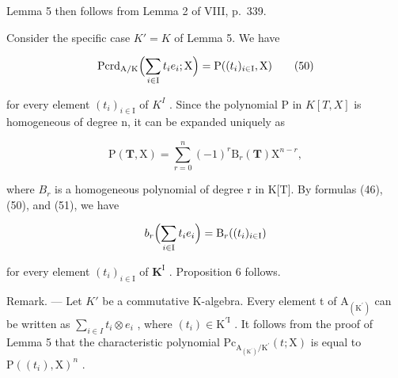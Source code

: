 Lemma 5 then follows from Lemma 2 of VIII, p.~339.

Consider the specific case \(K' = K\) of Lemma 5. We have

\[
\mathrm{Pcrd} _ {\mathrm{A/K}} \Bigl (\sum_ {i \in \mathrm{I}} t _ {i} e _ {i}; \mathrm{X} \Bigr) = \mathrm{P} ((t _ {i}) _ {i \in \mathrm{I}}, \mathrm{X})\tag{50}
\]

for every element \((t_{i})_{i\in\mathrm{I}}\) of \(K^{I}\) . Since the polynomial P in \(K[T,X]\) is homogeneous of degree n, it can be expanded uniquely as

\[
\mathrm{P} (\mathbf {T}, \mathrm{X}) = \sum_ {r = 0} ^ {n} (- 1) ^ {r} \mathrm{B} _ {r} (\mathbf {T}) \mathrm{X} ^ {n - r},\tag{51}
\]

where \(B_{r}\) is a homogeneous polynomial of degree r in K{[}T{]}. By formulas (46), (50), and (51), we have

\[
b _ {r} \Bigl (\sum_ {i \in \mathrm{I}} t _ {i} e _ {i} \Bigr) = \mathrm{B} _ {r} ((t _ {i}) _ {i \in \mathrm{I}})
\]

for every element \((t_i)_{i\in \mathrm{I}}\) of \(\mathbf{K}^{\mathrm{I}}\) . Proposition 6 follows.

Remark. --- Let \(K'\) be a commutative K-algebra. Every element t of \(\mathrm{A}_{(\mathrm{K}^{\prime})}\) can be written as \(\sum_{i\in I}t_{i}\otimes e_{i}\) , where \((t_{i})\in\mathrm{K}^{\prime\mathrm{I}}\) . It follows from the proof of Lemma 5 that the characteristic polynomial \(\mathrm{Pc}_{\mathrm{A}_{(\mathrm{K}^{\prime})}/\mathrm{K}^{\prime}}(t;\mathrm{X})\) is equal to \(\mathrm{P}((t_{i}),\mathrm{X})^{n}\) .
\relax{}
